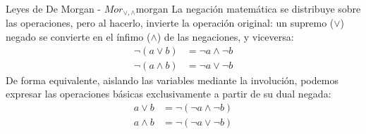\documentclass[12pt,a4paper]{article}
\begin{document}
\begin{teorema}{Leyes de De Morgan - $Mor_{\vee, \wedge}$}{morgan}
La negación matemática se distribuye sobre las operaciones, pero al hacerlo, invierte la operación original: un supremo ($\vee$) negado se convierte en el ínfimo ($\wedge$) de las negaciones, y viceversa:
\begin{align}
    \neg (a \vee b) &= \neg a \wedge \neg b \\
    \neg (a \wedge b) &= \neg a \vee \neg b 
\end{align}
De forma equivalente, aislando las variables mediante la involución, podemos expresar las operaciones básicas exclusivamente a partir de su dual negada:
\begin{align}
    a \vee b &= \neg (\neg a \wedge \neg b) \\
    a \wedge b &= \neg (\neg a \vee \neg b) 
\end{align}
\end{teorema}
\end{document}
